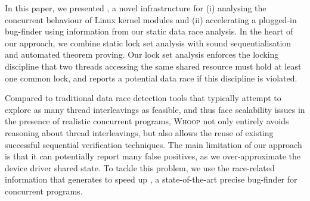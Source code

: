 In this paper, we presented \whoop, a novel infrastructure for (i) analysing the concurrent behaviour of Linux kernel modules and (ii) accelerating a plugged-in bug-finder using information from our static data race analysis. In the heart of our approach, we combine static lock set analysis with sound sequentialisation and automated theorem proving. Our lock set analysis enforces the locking discipline that two threads accessing the same shared resource must hold at least one common lock, and reports a potential data race if this discipline is violated.

Compared to traditional data race detection tools that typically attempt to explore as many thread interleavings as feasible, and thus face scalability issues in the presence of realistic concurrent programs, \textsc{Whoop} not only entirely avoids reasoning about thread interleavings, but also allows the reuse of existing successful sequential verification techniques. The main limitation of our approach is that it can potentially report many false positives, as we over-approximate the device driver shared state. To tackle this problem, we use the race-related information that \whoop generates to speed up \corral, a state-of-the-art precise bug-finder for concurrent programs.